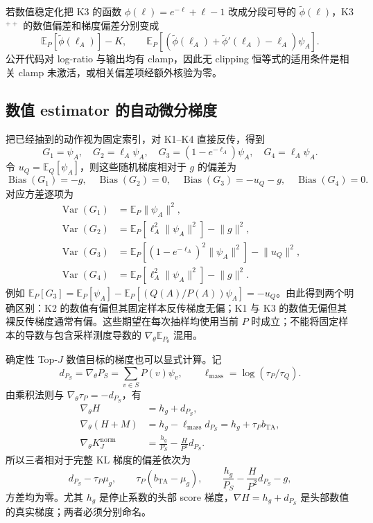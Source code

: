 \documentclass[lang=cn,scheme=chinese,openany]{../book/elegantbook}
\newcommand{\E}{\mathbb E}
\newcommand{\Var}{\operatorname{Var}}
\begin{document}
若数值稳定化把 K3 的函数 $\phi(\ell)=e^{-\ell}+\ell-1$ 改成分段可导的 $\widetilde\phi(\ell)$，K3$^{++}$ 的数值偏差和梯度偏差分别变成
\begin{equation*}
 \E_P[\widetilde\phi(\ell_A)]-K,\qquad
 \E_P[(\widetilde\phi(\ell_A)+\widetilde\phi'(\ell_A)-\ell_A)\psi_A].
\end{equation*}
公开代码对 log-ratio 与输出均有 clamp，因此无 clipping 恒等式的适用条件是相关 clamp 未激活，或相关偏差项经额外核验为零。

\subsection{数值 estimator 的自动微分梯度}

把已经抽到的动作视为固定索引，对 K1--K4 直接反传，得到
\begin{equation*}
 G_1=\psi_A,\quad G_2=\ell_A\psi_A,\quad
 G_3=(1-e^{-\ell_A})\psi_A,\quad G_4=\ell_A\psi_A.
\end{equation*}
令 $u_Q=\E_Q[\psi_A]$，则这些随机梯度相对于 $g$ 的偏差为
\begin{equation*}
 \operatorname{Bias}(G_1)=-g,\quad
 \operatorname{Bias}(G_2)=0,\quad
 \operatorname{Bias}(G_3)=-u_Q-g,\quad
 \operatorname{Bias}(G_4)=0.
\end{equation*}
对应方差逐项为
\begin{align*}
 \Var(G_1)&=\E_P\lVert \psi_A\rVert^2,\\
 \Var(G_2)&=\E_P[\ell_A^2\lVert \psi_A\rVert^2]-\lVert g\rVert^2,\\
 \Var(G_3)&=\E_P[(1-e^{-\ell_A})^2\lVert \psi_A\rVert^2]-\lVert u_Q\rVert^2,\\
 \Var(G_4)&=\E_P[\ell_A^2\lVert \psi_A\rVert^2]-\lVert g\rVert^2.
\end{align*}
例如 $\E_P[G_3]=\E_P[\psi_A]-\E_P[(Q(A)/P(A))\psi_A]=-u_Q$。由此得到两个明确区别：K2 的数值有偏但其固定样本反传梯度无偏；K1 与 K3 的数值无偏但其裸反传梯度通常有偏。这些期望在每次抽样均使用当前 $P$ 时成立；不能将固定样本的导数与包含采样测度导数的 $\nabla_\theta\E_{P_\theta}$ 混用。

确定性 Top-$J$ 数值目标的梯度也可以显式计算。记
\begin{equation*}
 d_{P_S}=\nabla_\theta P_S=\sum_{v\in S}P(v)\psi_v,
 \qquad \ell_{\mathrm{mass}}=\log(\tau_P/\tau_Q).
\end{equation*}
由乘积法则与 $\nabla_\theta\tau_P=-d_{P_S}$，有
\begin{align*}
 \nabla_\theta H&=h_g+d_{P_S},\\
 \nabla_\theta(H+M)&=h_g-\ell_{\mathrm{mass}}d_{P_S}=h_g+\tau_Pb_{\mathrm{TA}},\\
 \nabla_\theta K_J^{\mathrm{norm}}
 &=\frac{h_g}{P_S}-\frac{H}{P^2}d_{P_S}.
\end{align*}
所以三者相对于完整 KL 梯度的偏差依次为
\begin{equation*}
 d_{P_S}-\tau_P\mu_g,\qquad
 \tau_P(b_{\mathrm{TA}}-\mu_g),\qquad
 \frac{h_g}{P_S}-\frac{H}{P^2}d_{P_S}-g,
\end{equation*}
方差均为零。尤其 $h_g$ 是停止系数的头部 score 梯度，$\nabla H=h_g+d_{P_S}$ 是头部数值的真实梯度；两者必须分别命名。
\end{document}
